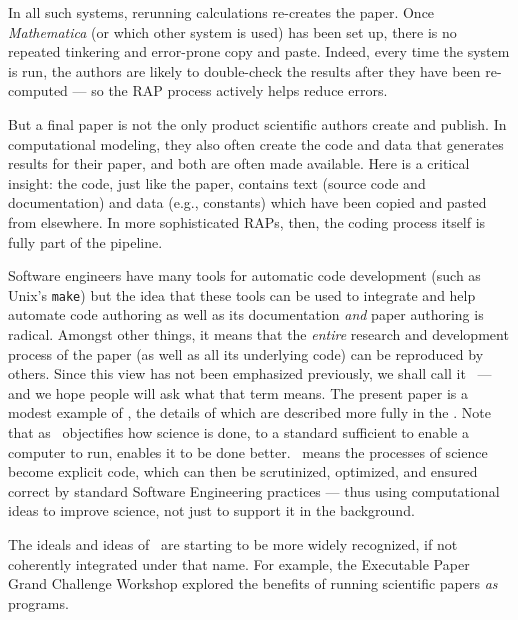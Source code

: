 \documentclass{comjnl}
\begin{document}
In all such systems, rerunning calculations re-creates the paper. Once \emph{Mathematica\/} (or which other system is used) has been set up, there is no repeated tinkering and error-prone copy and paste. Indeed, every time the system is run, the authors are likely to double-check the results after they have been re-computed --- so the RAP process actively helps reduce errors.

But a final paper is not the only product scientific authors create and publish. In computational modeling, they also often create the code and data that generates results for their paper, and both are often made available. Here is a critical insight: the code, just like the paper, contains text (source code and documentation) and data (e.g., constants) which have been copied and pasted from elsewhere. In more sophisticated RAPs, then, the coding process itself is fully part of the pipeline.

Software engineers have many tools for automatic code development (such as Unix's \texttt{make}) but the idea that these tools can be used to integrate and help automate code authoring as well as its documentation \emph{and\/} paper authoring is radical. Amongst other things, it means that the \emph{entire\/} research and development process of the paper (as well as all its underlying code) can be reproduced by others. Since this view has not been emphasized previously, we shall call it \RAPstar\ --- and we hope people will ask what that term means. The present paper is a modest example of \RAPstarp, the details of which are described more fully in the \supplement. Note that as \RAPstar\ objectifies how science is done, to a standard sufficient to enable a computer to run, enables it to be done better. \RAPstar\ means the processes of science become explicit code, which can then be scrutinized, optimized, and ensured correct by standard Software Engineering practices --- thus using computational ideas to improve science, not just to support it in the background.

The ideals and ideas of \RAPstar\ are starting to be more widely recognized, if not coherently integrated under that name. For example, the Executable Paper Grand Challenge Workshop \cite{Executable-Paper} explored the benefits of running scientific papers \emph{as\/} programs. 
\end{document}
